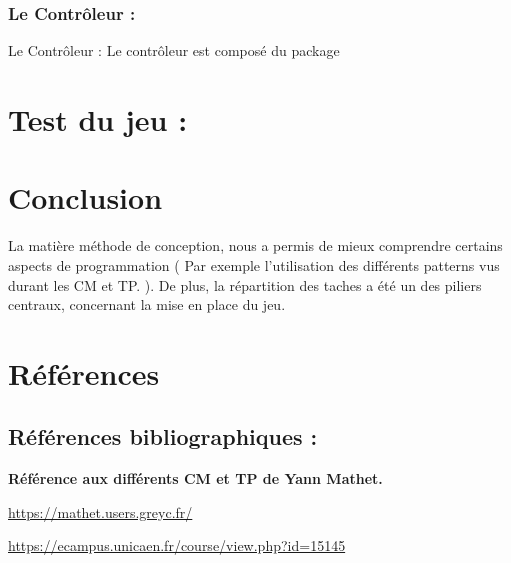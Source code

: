 \documentclass{article}
\begin{document}
\subsubsection{Le Contrôleur :}

\vspace{1\baselineskip}

Le Contrôleur : Le contrôleur est composé du package

\vspace{1\baselineskip}

\section{Test du jeu :}

\section{Conclusion}

La matière méthode de conception, nous a permis de mieux comprendre certains aspects de programmation ( Par exemple l'utilisation des différents patterns vus durant les CM et TP. ). De plus, la répartition des taches a été un des piliers centraux, concernant la mise en place du jeu.

\vspace{0.3\baselineskip}



\section{Références}

\subsection{Références bibliographiques :}




\vspace{1\baselineskip}

\bf Référence aux différents CM et TP de Yann Mathet.

\vspace{0.5\baselineskip}

\url{https://mathet.users.greyc.fr/}

\vspace{0.3\baselineskip}

\url{https://ecampus.unicaen.fr/course/view.php?id=15145}
\end{document}
